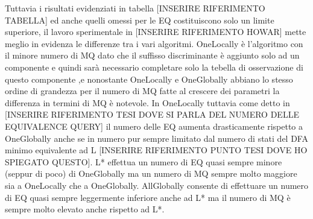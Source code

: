 Tuttavia i risultati evidenziati in tabella [INSERIRE RIFERIMENTO TABELLA] ed anche quelli omessi per le \ac{EQ} costituiscono solo un limite superiore, il lavoro sperimentale in [INSERIRE RIFERIMENTO HOWAR] mette meglio in evidenza le differenze tra i vari algoritmi. OneLocally è l'algoritmo con il minore numero di \ac{MQ} dato che il suffisso discriminante è aggiunto solo ad un componente e quindi sarà necessario completare solo la tebella di osservazione di questo componente ,e nonostante OneLocally e OneGlobally abbiano lo stesso ordine di grandezza per il numero di \ac{MQ} fatte al crescere dei parametri la differenza in termini di \ac{MQ} è notevole. In OneLocally tuttavia come detto in [INSERIRE RIFERIMENTO TESI DOVE SI PARLA DEL NUMERO DELLE EQUIVALENCE QUERY] il numero delle \ac{EQ} aumenta drasticamente rispetto a OneGlobally anche se in numero  pur sempre limitato dal numero di stati del \ac{DFA} minimo equivalente ad \ac{L} [INSERIRE RIFERIMENTO PUNTO TESI DOVE HO SPIEGATO QUESTO]. L* effettua un numero di \ac{EQ} quasi sempre minore (seppur di poco) di OneGlobally ma un numero di \ac{MQ} sempre molto maggiore sia a OneLocally che a OneGlobally. AllGlobally consente di effettuare un numero di \ac{EQ} quasi sempre leggermente inferiore anche ad L* ma il numero di \ac{MQ} è sempre molto elevato anche rispetto ad L*.

